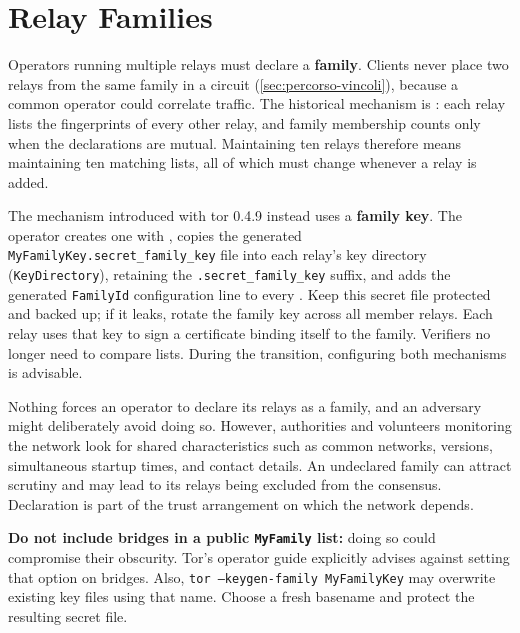 \section{Relay Families}\label{sec:relay-famiglie}

Operators running multiple relays must declare a \textbf{family}. Clients never place two relays from the same family in a circuit (\cref{sec:percorso-vincoli}), because a common operator could correlate traffic. The historical mechanism is : each relay lists the fingerprints of every other relay, and family membership counts only when the declarations are mutual. Maintaining ten relays therefore means maintaining ten matching lists, all of which must change whenever a relay is added.

The mechanism introduced with tor 0.4.9 instead uses a \textbf{family key}. The operator creates one with , copies the generated \texttt{MyFamilyKey.secret\_family\_key} file into each relay's key directory (\texttt{KeyDirectory}), retaining the \texttt{.secret\_family\_key} suffix, and adds the generated \texttt{FamilyId} configuration line to every . Keep this secret file protected and backed up; if it leaks, rotate the family key across all member relays. Each relay uses that key to sign a certificate binding itself to the family. Verifiers no longer need to compare lists. During the transition, configuring both mechanisms is advisable.

\begin{approfondimento}
Nothing forces an operator to declare its relays as a family, and an adversary might deliberately avoid doing so. However, authorities and volunteers monitoring the network look for shared characteristics such as common networks, versions, simultaneous startup times, and contact details. An undeclared family can attract scrutiny and may lead to its relays being excluded from the consensus. Declaration is part of the trust arrangement on which the network depends.
\end{approfondimento}

\textbf{Do not include bridges in a public \texttt{MyFamily} list:} doing so could compromise their obscurity. Tor's operator guide explicitly advises against setting that option on bridges. Also, \texttt{tor --keygen-family MyFamilyKey} may overwrite existing key files using that name. Choose a fresh basename and protect the resulting secret file.

